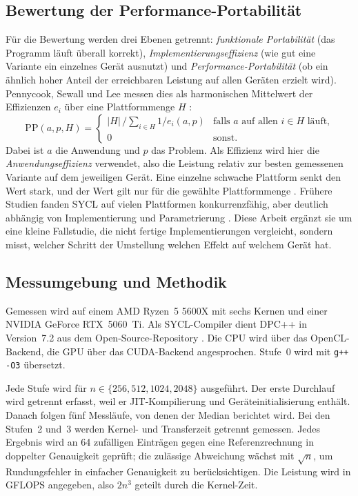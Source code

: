 \documentclass[12pt,a4paper]{article}
\begin{document}
\subsection{Bewertung der Performance-Portabilität}\label{sec:pp}

Für die Bewertung werden drei Ebenen getrennt: \emph{funktionale
Portabilität} (das Programm läuft überall korrekt),
\emph{Implementierungseffizienz} (wie gut eine Variante ein einzelnes Gerät
ausnutzt) und \emph{Performance-Portabilität} (ob ein ähnlich hoher Anteil der
erreichbaren Leistung auf allen Geräten erzielt wird). Pennycook, Sewall und Lee messen dies als harmonischen
Mittelwert der Effizienzen $e_i$ über eine Plattformmenge $H$
\cite{pennycook2016metric}:
\[
    \mathrm{PP}(a, p, H) =
    \begin{cases}
        |H| \,\big/ \sum_{i \in H} 1/e_i(a,p) & \text{falls $a$ auf allen $i \in H$ läuft,}\\
        0 & \text{sonst.}
    \end{cases}
\]
Dabei ist $a$ die Anwendung und $p$ das Problem. Als Effizienz wird hier die
\emph{Anwendungseffizienz} verwendet, also die Leistung relativ zur besten
gemessenen Variante auf dem jeweiligen Gerät. Eine einzelne schwache
Plattform senkt den Wert stark, und der Wert gilt nur für die gewählte
Plattformmenge \cite{pennycook2019implications}. Frühere Studien fanden
SYCL auf vielen Plattformen konkurrenzfähig, aber deutlich abhängig von
Implementierung und Parametrierung \cite{deakin2020sycl, breyer2022svm}.
Diese Arbeit ergänzt sie um eine kleine Fallstudie, die nicht fertige
Implementierungen vergleicht, sondern misst, welcher Schritt der Umstellung
welchen Effekt auf welchem Gerät hat.

\subsection{Messumgebung und Methodik}

Gemessen wird auf einem AMD Ryzen~5 5600X mit sechs Kernen und einer NVIDIA
GeForce RTX~5060~Ti. Als SYCL-Compiler dient DPC++ in Version~7.2 aus dem
Open-Source-Repository \cite{intel_llvm}. Die CPU wird über das
OpenCL-Backend, die GPU über das CUDA-Backend angesprochen. Stufe~0 wird mit
\texttt{g++ -O3} übersetzt.

Jede Stufe wird für $n \in \{256, 512, 1024, 2048\}$ ausgeführt. Der erste
Durchlauf wird getrennt erfasst, weil er JIT-Kompilierung und
Geräteinitialisierung enthält. Danach folgen fünf Messläufe, von denen der
Median berichtet wird. Bei den Stufen~2 und~3 werden Kernel- und Transferzeit
getrennt gemessen. Jedes Ergebnis wird an 64 zufälligen Einträgen gegen eine
Referenzrechnung in doppelter Genauigkeit geprüft; die zulässige Abweichung
wächst mit $\sqrt{n}$, um Rundungsfehler in einfacher Genauigkeit zu
berücksichtigen. Die Leistung wird in GFLOPS angegeben, also $2n^3$ geteilt
durch die Kernel-Zeit.
\end{document}
